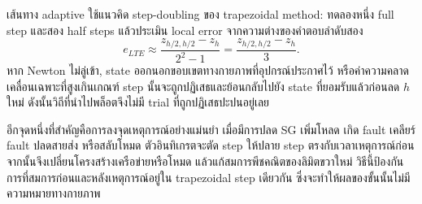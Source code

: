 \documentclass[12pt,a4paper]{article}
\begin{document}
เส้นทาง adaptive ใช้แนวคิด step-doubling ของ trapezoidal method: ทดลองหนึ่ง full step และสอง half steps แล้วประเมิน local error จากความต่างของคำตอบลำดับสอง
\begin{equation}
e_{LTE}\approx\frac{z_{h/2,h/2}-z_h}{2^2-1}=\frac{z_{h/2,h/2}-z_h}{3}.
\label{eq:lte_summary}
\end{equation}
หาก Newton ไม่ลู่เข้า, state ออกนอกขอบเขตทางกายภาพที่อุปกรณ์ประกาศไว้ หรือค่าความคลาดเคลื่อนเฉพาะที่สูงเกินเกณฑ์ step นั้นจะถูกปฏิเสธและย้อนกลับไปยัง state ที่ยอมรับแล้วก่อนลด $h$ ใหม่ ดังนั้นวิถีที่นำไปพล็อตจึงไม่มี trial ที่ถูกปฏิเสธปะปนอยู่เลย

อีกจุดหนึ่งที่สำคัญคือการลงจุดเหตุการณ์อย่างแม่นยำ เมื่อมีการปลด SG เพิ่มโหลด เกิด fault เคลียร์ fault ปลดสายส่ง หรือสลับโหมด ตัวอินทิเกรตจะตัด step ให้ปลาย step ตรงกับเวลาเหตุการณ์ก่อน จากนั้นจึงเปลี่ยนโครงสร้างเครือข่ายหรือโหมด แล้วแก้สมการพีชคณิตของลิมิตขวาใหม่ วิธีนี้ป้องกันการที่สมการก่อนและหลังเหตุการณ์อยู่ใน trapezoidal step เดียวกัน ซึ่งจะทำให้ผลของขั้นนั้นไม่มีความหมายทางกายภาพ
\end{document}

